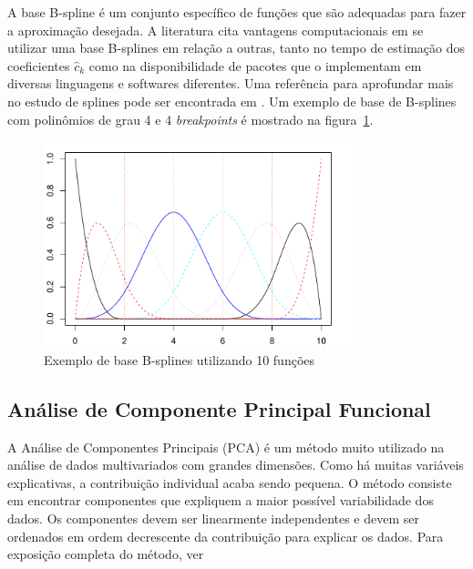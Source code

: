 \documentclass[
	12pt,				%
	openright,			%
	oneside,			%
	a4paper,			%
	english,			%
	brazil				%
	]{dissertacao-ufrgs-abntex2}
\begin{document}
A base B-spline é um conjunto específico de funções que são adequadas para fazer a aproximação desejada.
A literatura cita vantagens computacionais em se utilizar uma base B-splines em relação a outras, tanto no tempo de estimação dos coeficientes $\hat{c}_k$ como na disponibilidade de pacotes que o implementam em diversas linguagens e softwares diferentes.
Uma referência para aprofundar mais no estudo de splines pode ser encontrada em . Um exemplo de base de B-splines com polinômios de grau 4 e 4 \emph{breakpoints} é mostrado na figura~\ref{fig:base-bspline}.
\begin{figure}[h!] 
  \centering
    \includegraphics[width=0.8\textwidth]{anexos/base_bsplines1.pdf}
  \caption{Exemplo de base B-splines utilizando 10 funções}
  \label{fig:base-bspline}
\end{figure}

\subsection{Análise de Componente Principal Funcional}
\label{FPCA}

A Análise de Componentes Principais (PCA) é um método muito utilizado na análise de dados multivariados com grandes dimensões. Como há muitas variáveis explicativas, a contribuição individual acaba sendo pequena. O método consiste em encontrar componentes que expliquem a maior possível variabilidade dos dados. Os componentes devem ser linearmente independentes e devem ser ordenados em ordem decrescente da contribuição para explicar os dados. Para exposição completa do método, ver 
\end{document}
